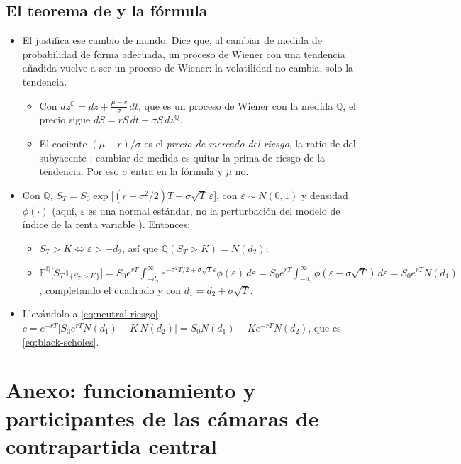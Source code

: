 \documentclass[11pt]{article}
\begin{document}
\subsection{El teorema de  y la fórmula}

\begin{itemize}
\item El \nocite{Girsanov1960} justifica ese cambio de mundo. Dice que, al cambiar de medida de probabilidad de forma adecuada, un proceso de Wiener con una tendencia añadida vuelve a ser un proceso de Wiener: la volatilidad no cambia, solo la tendencia.
  \begin{itemize}
  \item Con $dz^{\mathbb{Q}}=dz+\frac{\mu-r}{\sigma}\,dt$, que es un proceso de Wiener con la medida $\mathbb{Q}$, el precio sigue $dS=rS\,dt+\sigma S\,dz^{\mathbb{Q}}$.
  \item El cociente $(\mu-r)/\sigma$ es el \emph{precio de mercado del riesgo}, la ratio de  del subyacente : cambiar de medida es quitar la prima de riesgo de la tendencia. Por eso $\sigma$ entra en la fórmula y $\mu$ no.
  \end{itemize}
\item Con $\mathbb{Q}$, $S_T=S_0\exp\big[(r-\sigma^2/2)T+\sigma\sqrt{T}\,\varepsilon\big]$, con $\varepsilon\sim N(0,1)$ y densidad $\phi(\cdot)$ (aquí, $\varepsilon$ es una normal estándar, no la perturbación del modelo de índice de la renta variable ). Entonces:
  \begin{itemize}
  \item $S_T>K\iff\varepsilon>-d_2$, así que $\mathbb{Q}(S_T>K)=N(d_2)$;
  \item $\mathbb{E}^{\mathbb{Q}}\big[S_T\mathbf{1}_{\{S_T>K\}}\big]=S_0e^{rT}\int_{-d_2}^{\infty}e^{-\sigma^2T/2+\sigma\sqrt{T}\varepsilon}\phi(\varepsilon)\,d\varepsilon=S_0e^{rT}\int_{-d_2}^{\infty}\phi(\varepsilon-\sigma\sqrt{T})\,d\varepsilon=S_0e^{rT}N(d_1)$, completando el cuadrado y con $d_1=d_2+\sigma\sqrt{T}$.
  \end{itemize}
\item Llevándolo a \eqref{eq:neutral-riesgo}, $c=e^{-rT}\big[S_0e^{rT}N(d_1)-K\,N(d_2)\big]=S_0N(d_1)-Ke^{-rT}N(d_2)$, que es \eqref{eq:black-scholes}. \findemo
\end{itemize}

\section{Anexo: funcionamiento y participantes\cortetitulo{} de las cámaras de contrapartida central}\label{anexo:ccp}
\end{document}
